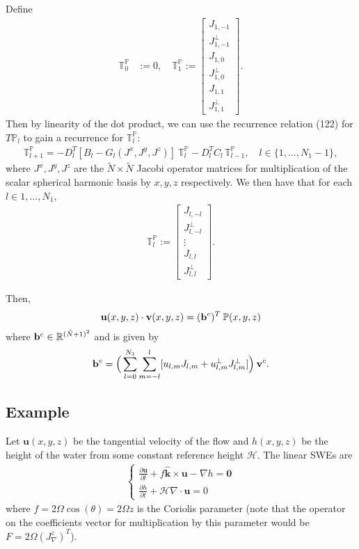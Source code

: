 \documentclass[11pt, oneside]{article}   	%
\newcommand{\R}{\mathbb{R}}
\newcommand{\bigP}{\mathbb{P}}
\newcommand{\gradPl}{T\mathbb{P}_l}
\newcommand{\Dlt}{D^T_l}
\newcommand{\unitvec}{\hat{\bm{k}}}
\begin{document}
Define
\begin{align}
\mathbb{T}^\bigP_0 &:= 0, \quad
\mathbb{T}^\bigP_1 := \begin{bmatrix}
			J_{1,-1} \\
			J^\perp_{1,-1} \\
			J_{1,0} \\
			J^\perp_{1,0} \\
			J_{1,1} \\
			J^\perp_{1,1}
	  	\end{bmatrix}.
\end{align}
Then by linearity of the dot product, we can use the recurrence relation (122) for \(\gradPl\) to gain a recurrence for \(\mathbb{T}^\bigP_l\):
\begin{align}
\mathbb{T}^\bigP_{l+1} = -\Dlt [B_l-G_l(J^x, J^y, J^z)] \: \mathbb{T}^\bigP_l - \Dlt C_l  \, \mathbb{T}^\bigP_{l-1}, \quad l \in \{1,\dots,N_1-1\},
\end{align}
where \(J^x, J^y, J^z\) are the \(\tilde{N} \times \tilde{N}\) Jacobi operator matrices for multiplication of the scalar spherical harmonic basis by \(x, y, z\) respectively. We then have that for each \(l \in {1,\dots,N_1}\),
\begin{align}
\mathbb{T}^\bigP_l := \begin{bmatrix}
			J_{l,-l} \\
			J^\perp_{l,-l} \\
			\vdots \\
			J_{l,l} \\
			J^\perp_{l,l}
	  	\end{bmatrix}.
\end{align}

Then, 
\begin{align}
\bold{u}(x,y,z) \cdot \bold{v}(x,y,z) = (\bold{b}^c)^T  \: \bigP(x,y,z)
\end{align}
where \(\bold{b}^c \in \R^{(\tilde{N}+1)^2}\) and is given by
\begin{align}
\bold{b}^c = \Big(\sum_{l=0}^{N_1} \sum_{m=-l}^{l} [ u_{l,m} J_{l,m} + u^{\perp}_{l,m} J^\perp_{l,m} ] \Big) \: \bold{v}^c.
\end{align}


\subsection{Example}

Let $\mathbf{u}(x,y,z)$ be the tangential velocity of the flow and $h(x,y,z)$ be the height of the water from some constant reference height $\mathcal{H}$. The linear SWEs are
\begin{align}
\begin{cases}
\frac{\partial \mathbf{u}}{\partial t} + f \unitvec \times \mathbf{u} - \nabla h = \mathbf{0} \\
\frac{\partial h}{\partial t} + \mathcal{H} \nabla \cdot \mathbf{u} = 0
\end{cases}
\end{align}
where $f = 2 \Omega \cos(\theta) =  2 \Omega z$ is the Coriolis parameter (note that the operator on the coefficients vector for multiplication by this parameter would be $F = 2 \Omega (J^z_\nabla)^T$).
\end{document}
